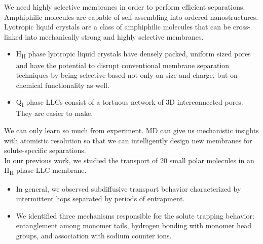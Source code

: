 \documentclass{article}
\begin{document}

  We need highly selective membranes in order to perform efficient separations. \\

  \noindent Amphiphilic molecules are capable of self-assembling into ordered nanostructures.\\

  Lyotropic liquid crystals are a class of amphiphilic molecules that can be cross-linked
  into mechanically strong and highly selective membranes.
  \begin{itemize}
  	\item H\textsubscript{II} phase lyotropic liquid crystals have densely packed, uniform
	sized pores and have the potential to disrupt conventional membrane separation
	techniques by being selective based not only on size and charge, but on chemical
	functionality as well.
	\item Q\textsubscript{I} phase LLCs consist of a tortuous network of 3D interconnected
	pores. They are easier to make.
  \end{itemize}

  We can only learn so much from experiment. MD can give us mechanistic insights with
  atomistic resolution so that we can intelligently design new membranes for 
  solute-specific separations.\\

  \noindent In our previous work, we studied the transport of 20 small polar molecules
  in an H\textsubscript{II} phase LLC membrane.
  \begin{itemize}
    \item In general, we observed subdiffusive transport behavior characterized by 
    intermittent hops separated by periods of entrapment.
    \item We identified three mechanisms responsible for the solute trapping behavior:
    entanglement among monomer tails, hydrogen bonding with monomer head groups, and
    association with sodium counter ions.
  \end{itemize}
\end{document}
